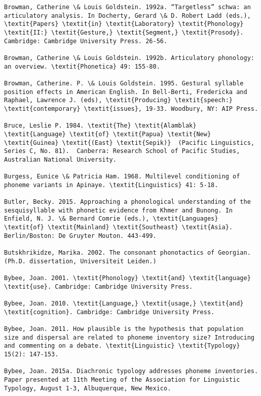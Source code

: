 \begin{verbatim}
Browman, Catherine \& Louis Goldstein. 1992a. “Targetless” schwa: an articulatory analysis. In Docherty, Gerard \& D. Robert Ladd (eds.), \textit{Papers} \textit{in} \textit{Laboratory} \textit{Phonology} \textit{II:} \textit{Gesture,} \textit{Segment,} \textit{Prosody}. Cambridge: Cambridge University Press. 26-56.

Browman, Catherine \& Louis Goldstein. 1992b. Articulatory phonology: an overview. \textit{Phonetica} 49: 155-80.

Browman, Catherine. P. \& Louis Goldstein. 1995. Gestural syllable position effects in American English. In Bell-Berti, Fredericka and Raphael, Lawrence J. (eds), \textit{Producing} \textit{speech:} \textit{contemporary} \textit{issues}, 19-33. Woodbury, NY: AIP Press.

Bruce, Leslie P. 1984. \textit{The} \textit{Alamblak} \textit{Language} \textit{of} \textit{Papua} \textit{New} \textit{Guinea} \textit{(East} \textit{Sepik)}  (Pacific Linguistics, Series C, No. 81).  Canberra: Research School of Pacific Studies, Australian National University.

Burgess, Eunice \& Patricia Ham. 1968. Multilevel conditioning of phoneme variants in Apinaye. \textit{Linguistics} 41: 5-18.

Butler, Becky. 2015. Approaching a phonological understanding of the sesquisyllable with phonetic evidence from Khmer and Bunong. In Enfield, N. J. \& Bernard Comrie (eds.), \textit{Languages} \textit{of} \textit{Mainland} \textit{Southeast} \textit{Asia}. Berlin/Boston: De Gruyter Mouton. 443-499.

Butskhrikidze, Marika. 2002. The consonant phonotactics of Georgian. (Ph.D. dissertation, Universiteit Leiden.)

Bybee, Joan. 2001. \textit{Phonology} \textit{and} \textit{language} \textit{use}. Cambridge: Cambridge University Press.

Bybee, Joan. 2010. \textit{Language,} \textit{usage,} \textit{and} \textit{cognition}. Cambridge: Cambridge University Press.

Bybee, Joan. 2011. How plausible is the hypothesis that population size and dispersal are related to phoneme inventory size? Introducing and commenting on a debate. \textit{Linguistic} \textit{Typology} 15(2): 147-153.

Bybee, Joan. 2015a. Diachronic typology addresses phoneme inventories. Paper presented at 11th Meeting of the Association for Linguistic Typology, August 1-3, Albuquerque, New Mexico.


\end{verbatim}
